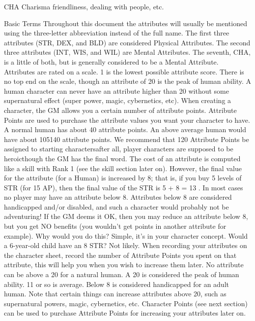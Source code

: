 \documentclass[twoside]{book}
\begin{document}
                  
                   CHA   
                   Charisma   
                     friendliness, dealing with people, etc.
                     
                  
                
              Basic Terms  
             Throughout this document the attributes will usually
               be mentioned using the three-letter abbreviation instead
               of the full name.  The first three attributes (STR, DEX, and BLD) are
               considered Physical Attributes. The second three
               attributes (INT, WIS, and WIL) are Mental Attributes. The
               seventh, CHA, is a little of both, but is generally
               considered to be a Mental Attribute.  Attributes are rated on a scale. 1 is the lowest
               possible attribute score. There is no top end on the
               scale, though an attribute of 20 is the peak of human
               ability. A human character can never have an attribute
               higher than 20 without some supernatural effect (super
               power, magic, cybernetics, etc).  When creating a character, the GM allows you a
               certain number of attribute points. Attribute Points are
               used to purchase the attribute values you want your
               character to have. A normal human has about 40 attribute
               points. An above average human would have about
               105140 attribute points. We recommend that 120
               Attribute Points be assigned to starting
               charactersafter all, player characters are supposed
               to be heroicthough the GM has the final word.
                The cost of an attribute is computed like a skill
              with Rank 1 (see the skill section later on). However, the
              final value for the attribute (for a Human) is increased by
              8; that is, if you buy 5 levels of STR (for 15 AP), then
              the final value of the STR is  5  +
               8  =    13 .
             In most cases no player may have an attribute below
               8. Attributes below 8 are considered handicapped and/or
               disabled, and such a character would probably not be
               adventuring!  If the GM deems it OK, then you may reduce an
               attribute below 8, but you get NO benefits (you
               wouldn't get points in another attribute for
               example). Why would you do this? Simple, it's in
               your character concept. Would a 6-year-old child have an 8
               STR? Not likely.  When recording your attributes on the character
               sheet, record the number of Attribute Points you spent on
               that attribute, this will help you when you wish to
               increase them later.  No attribute can be above a 20 for a natural human.
               A 20 is considered the peak of human ability. 11 or so is
               average. Below 8 is considered handicapped for an adult
               human. Note that certain things can increase attributes
               above 20, such as supernatural powers, magic, cybernetics,
               etc.  Character Points (see next section) can be used to
               purchase Attribute Points for increasing your attributes
               later on. 
\end{document}
